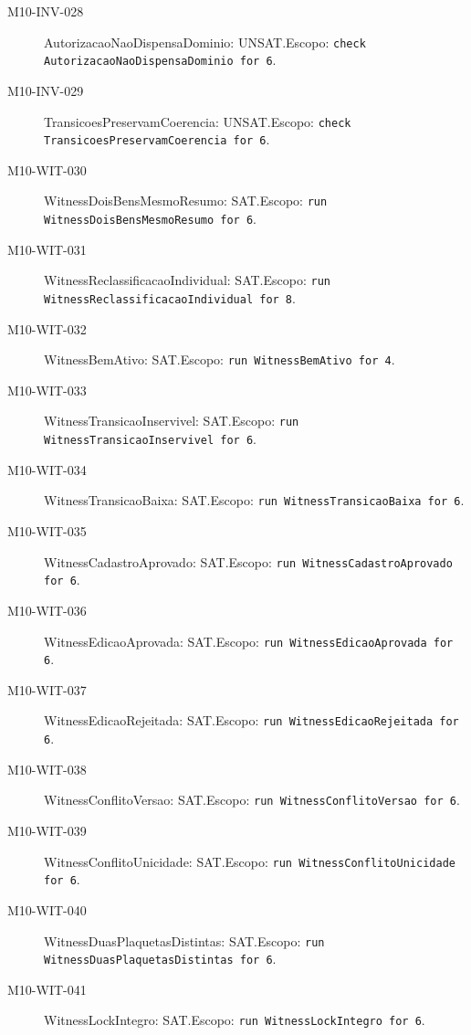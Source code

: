 \begin{description}
\item[M10-INV-028] AutorizacaoNaoDispensaDominio: UNSAT.\newline Escopo: \texttt{check AutorizacaoNaoDispensaDominio for 6}.
\item[M10-INV-029] TransicoesPreservamCoerencia: UNSAT.\newline Escopo: \texttt{check TransicoesPreservamCoerencia for 6}.
\item[M10-WIT-030] WitnessDoisBensMesmoResumo: SAT.\newline Escopo: \texttt{run WitnessDoisBensMesmoResumo for 6}.
\item[M10-WIT-031] WitnessReclassificacaoIndividual: SAT.\newline Escopo: \texttt{run WitnessReclassificacaoIndividual for 8}.
\item[M10-WIT-032] WitnessBemAtivo: SAT.\newline Escopo: \texttt{run WitnessBemAtivo for 4}.
\item[M10-WIT-033] WitnessTransicaoInservivel: SAT.\newline Escopo: \texttt{run WitnessTransicaoInservivel for 6}.
\item[M10-WIT-034] WitnessTransicaoBaixa: SAT.\newline Escopo: \texttt{run WitnessTransicaoBaixa for 6}.
\item[M10-WIT-035] WitnessCadastroAprovado: SAT.\newline Escopo: \texttt{run WitnessCadastroAprovado for 6}.
\item[M10-WIT-036] WitnessEdicaoAprovada: SAT.\newline Escopo: \texttt{run WitnessEdicaoAprovada for 6}.
\item[M10-WIT-037] WitnessEdicaoRejeitada: SAT.\newline Escopo: \texttt{run WitnessEdicaoRejeitada for 6}.
\item[M10-WIT-038] WitnessConflitoVersao: SAT.\newline Escopo: \texttt{run WitnessConflitoVersao for 6}.
\item[M10-WIT-039] WitnessConflitoUnicidade: SAT.\newline Escopo: \texttt{run WitnessConflitoUnicidade for 6}.
\item[M10-WIT-040] WitnessDuasPlaquetasDistintas: SAT.\newline Escopo: \texttt{run WitnessDuasPlaquetasDistintas for 6}.
\item[M10-WIT-041] WitnessLockIntegro: SAT.\newline Escopo: \texttt{run WitnessLockIntegro for 6}.

\end{description}
